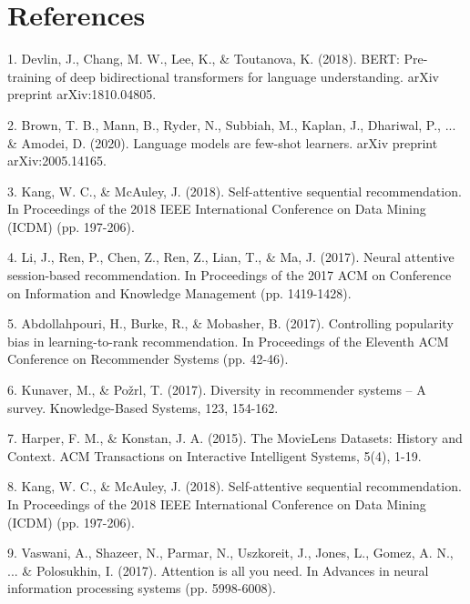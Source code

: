\documentclass[10pt,twocolumn,letterpaper]{article}
\begin{document}
\section{References}

1. Devlin, J., Chang, M. W., Lee, K., & Toutanova, K. (2018). BERT: Pre-training of deep bidirectional transformers for language understanding. arXiv preprint arXiv:1810.04805.

2. Brown, T. B., Mann, B., Ryder, N., Subbiah, M., Kaplan, J., Dhariwal, P., ... & Amodei, D. (2020). Language models are few-shot learners. arXiv preprint arXiv:2005.14165.

3. Kang, W. C., & McAuley, J. (2018). Self-attentive sequential recommendation. In Proceedings of the 2018 IEEE International Conference on Data Mining (ICDM) (pp. 197-206).

4. Li, J., Ren, P., Chen, Z., Ren, Z., Lian, T., & Ma, J. (2017). Neural attentive session-based recommendation. In Proceedings of the 2017 ACM on Conference on Information and Knowledge Management (pp. 1419-1428).

5. Abdollahpouri, H., Burke, R., & Mobasher, B. (2017). Controlling popularity bias in learning-to-rank recommendation. In Proceedings of the Eleventh ACM Conference on Recommender Systems (pp. 42-46).

6. Kunaver, M., & Požrl, T. (2017). Diversity in recommender systems – A survey. Knowledge-Based Systems, 123, 154-162.

7. Harper, F. M., & Konstan, J. A. (2015). The MovieLens Datasets: History and Context. ACM Transactions on Interactive Intelligent Systems, 5(4), 1-19.

8. Kang, W. C., & McAuley, J. (2018). Self-attentive sequential recommendation. In Proceedings of the 2018 IEEE International Conference on Data Mining (ICDM) (pp. 197-206).

9. Vaswani, A., Shazeer, N., Parmar, N., Uszkoreit, J., Jones, L., Gomez, A. N., ... & Polosukhin, I. (2017). Attention is all you need. In Advances in neural information processing systems (pp. 5998-6008).
\end{document}
